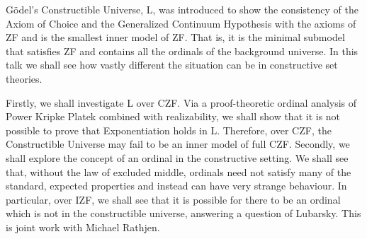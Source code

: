 \documentclass[bsl,meeting]{asl}
\newcommand{\NP}{}
\begin{document}
\thispagestyle{empty}


\NP  
{}


G\"{o}del's Constructible Universe, L, was introduced to show the consistency of the Axiom of Choice and the Generalized Continuum Hypothesis with the axioms of ZF and is the smallest inner model of ZF. That is, it is the minimal submodel that satisfies ZF and contains all the ordinals of the background universe. In this talk we shall see how vastly different the situation can be in constructive set theories. 

Firstly, we shall investigate L over CZF. Via a proof-theoretic ordinal analysis of Power Kripke Platek combined with realizability, we shall show that it is not possible to prove that Exponentiation holds in L. Therefore, over CZF, the Constructible Universe may fail to be an inner model of full CZF. Secondly, we shall explore the concept of an ordinal in the constructive setting. We shall see that, without the law of excluded middle, ordinals need not satisfy many of the standard, expected properties and instead can have very strange behaviour.  In particular, over IZF, we shall see that it is possible for there to be an ordinal which is not in the constructible universe, answering a question of Lubarsky. This is joint work with Michael Rathjen.





\end{document}
